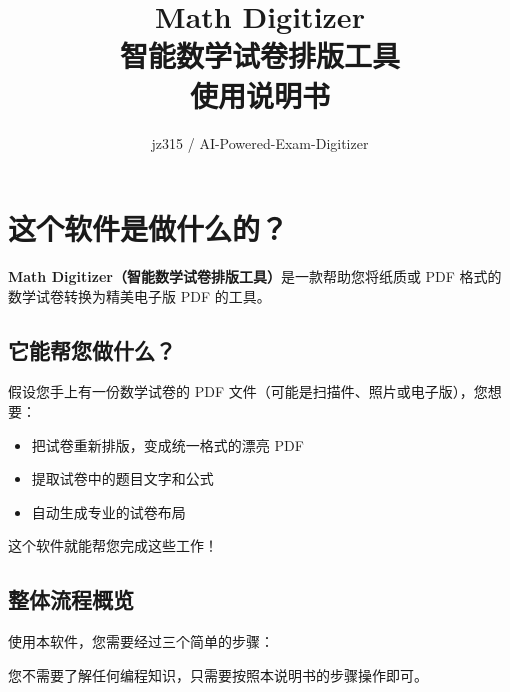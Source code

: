 \documentclass[UTF8,zihao=-4,openany]{ctexbook}
\title{Math Digitizer\\智能数学试卷排版工具\\使用说明书}
\author{jz315 / AI-Powered-Exam-Digitizer}
\date{}
\begin{document}
\frontmatter
\maketitle
\tableofcontents

\mainmatter

\chapter{这个软件是做什么的？}

\textbf{Math Digitizer（智能数学试卷排版工具）}是一款帮助您将纸质或 PDF 格式的数学试卷转换为精美电子版 PDF 的工具。

\section{它能帮您做什么？}

假设您手上有一份数学试卷的 PDF 文件（可能是扫描件、照片或电子版），您想要：
\begin{itemize}
	\item 把试卷重新排版，变成统一格式的漂亮 PDF
	\item 提取试卷中的题目文字和公式
	\item 自动生成专业的试卷布局
\end{itemize}

这个软件就能帮您完成这些工作！

\section{整体流程概览}

使用本软件，您需要经过三个简单的步骤：

\begin{center}
\end{center}

\begin{TipBox}
	您不需要了解任何编程知识，只需要按照本说明书的步骤操作即可。
\end{TipBox}
\end{document}

